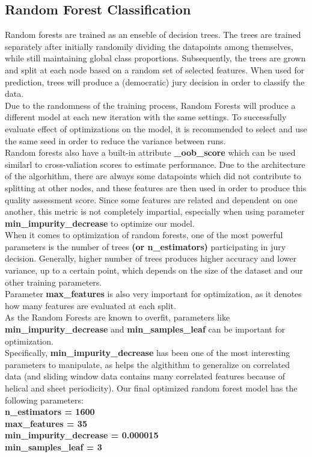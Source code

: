 \documentclass[12pt]{article}
\begin{document}
\subsection{Random Forest Classification}

Random forests are trained as an enseble of decision trees. The trees are trained separately after initially randomily dividing the datapoints among themselves, while still maintaining global class proportions. Subsequently, the trees are grown and split at each node based on a random set of selected features. When used for prediction, trees will produce a (democratic) jury decision in order to classify the data. \\
Due to the randomness of the training process, Random Forests will produce a different model at each new iteration with the same settings. To successfully evaluate effect of optimizations on the model, it is recommended to select and use the same seed in order to reduce the variance between runs.\\
Random forests also have a built-in attribute \textbf{{\_}oob{\_}score} which can be used similarl to cross-valiation scores to estimate performance. Due to the architecture of the algorhithm, there are always some datapoints which did not contribute to splitting at other nodes, and these features are then used in order to produce this quality assessment score. Since some features are related and dependent on one another, this metric is not completely impartial, especially when using parameter \textbf{min{\_}impurity{\_}decrease} to optimize our model.\\
When it comes to optimization of random forests, one of the most powerful parameters is the number of trees \textbf{(or n{\_}estimators)} participating in jury decision.  Generally, higher number of trees produces higher  accuracy and lower variance, up to a certain point, which depends on the size of the dataset and our other training parameters. \\
Parameter \textbf{max{\_}features} is also very important for optimization, as it denotes how many features are evaluated at each split. \\
As the Random Forests are known to overfit, parameters like \textbf{min{\_}impurity{\_}decrease} and \textbf{min{\_}samples{\_}leaf} can be important for optimization.\\ Specifically, \textbf{min{\_}impurity{\_}decrease} has been one of the most interesting parameters to manipulate, as helps the algithithm to generalize on correlated data (and sliding window data contains many correlated features because of helical and sheet periodicity).
Our final optimized random forest model has the following parameters:\\[0.5cm]
\indent \textbf{n{\_}estimators = 1600}\\
\indent \textbf{max{\_}features = 35}\\
\indent \textbf{min{\_}impurity{\_}decrease = 0.000015}\\
\indent \textbf{min{\_}samples{\_}leaf = 3}\\
\end{document}
